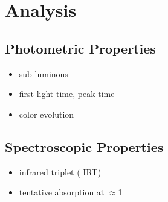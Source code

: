\documentclass[twocolumn]{aastex631}
\begin{document}
\section{Analysis} \label{sec:analysis}
\subsection{Photometric Properties}
\begin{itemize}
    \item sub-luminous
    \item first light time, peak time
    \item color evolution
\end{itemize}

\subsection{Spectroscopic Properties}
\begin{itemize}
    \item infrared  triplet ( IRT)
    \item tentative  absorption at $\approx$1 \micron
\end{itemize}
\end{document}
